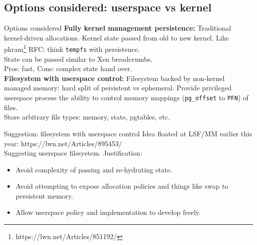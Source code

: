 \documentclass{beamer}
\begin{document}
\subsection{Options considered: userspace vs kernel}
\begin{frame}{Options considered}
  \textbf{Fully kernel management persistence:} Traditional kernel-driven allocations.
  Kernel state passed from old to new kernel. 
  Like pkram\footnote{https://lwn.net/Articles/851192/} RFC; think \texttt{tempfs} with persistence.\\
  State can be passed similar to Xen breadcrumbs.\\
  Pros: fast, Cons: complex state hand over.\\
  
  \textbf{Filesystem with userspace control:} Filesystem backed by non-kernel managed memory: hard split of persistent vs ephemeral.
  Provide privileged userspace process the ability to control memory mappings (\texttt{pg\_offset} to \texttt{PFN}) of files.\\
  Store arbitrary file types: memory, state, pgtables, etc.
\end{frame}

\begin{frame}{Suggestion: filesystem with userspace control}
  Idea floated at LSF/MM earlier this year: https://lwn.net/Articles/895453/\\

  Suggesting userspace filesystem. Justification:
  \begin{itemize}
    \item Avoid complexity of passing and re-hydrating state.
    \item Avoid attempting to expose allocation policies and things like swap to persistent memory.
    \item Allow userspace policy and implementation to develop freely.
  \end{itemize}
\end{frame}
\end{document}
